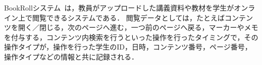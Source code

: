 \documentclass[platex,dvipdfmx,a4paper,twocolumn,base=10pt,jbase=10pt,ja=standard]{bxjsarticle}
\begin{document}
\quad 
BookRollシステム~\cite{BookRoll}は，教員がアップロードした講義資料や教材を学生がオンライン上で閲覧できるシステムである．
% 
%
%
閲覧データとしては，たとえばコンテンツを開く／閉じる，次のページへ進む，一つ前のページへ戻る，マーカーやメモを付与する，コンテンツ内検索を行うといった操作を行ったタイミングで，その操作タイプが，操作を行った学生のID，日時，コンテンツ番号，ページ番号，操作タイプなどの情報と共に記録される．

\end{document}
